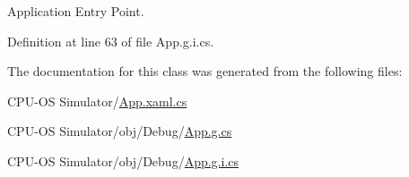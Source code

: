 Application Entry Point. 



Definition at line 63 of file App.\+g.\+i.\+cs.



The documentation for this class was generated from the following files\+:\begin{DoxyCompactItemize}
\item 
C\+P\+U-\/\+O\+S Simulator/\hyperlink{_app_8xaml_8cs}{App.\+xaml.\+cs}\item 
C\+P\+U-\/\+O\+S Simulator/obj/\+Debug/\hyperlink{_debug_2_app_8g_8cs}{App.\+g.\+cs}\item 
C\+P\+U-\/\+O\+S Simulator/obj/\+Debug/\hyperlink{_debug_2_app_8g_8i_8cs}{App.\+g.\+i.\+cs}\end{DoxyCompactItemize}
